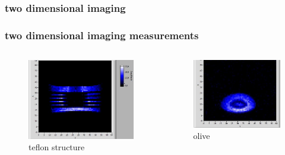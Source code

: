 \documentclass[aspectratio=169]{beamer}
\begin{document}
\subsubsection{two dimensional imaging}

\begin{frame}
\frametitle{two dimensional imaging measurements}
\begin{columns}
\begin{figure}
\includegraphics[width=.80 \linewidth]{./Resources/Teil_3/ptfe_vert.JPG}
\caption{teflon structure}
\end{figure}

\begin{figure}
\includegraphics[width=0.8 \linewidth]{./Resources/Teil_3/olive_2d.JPG}
\caption{olive}
\end{figure}

\end{columns}
\end{frame}
\end{document}
